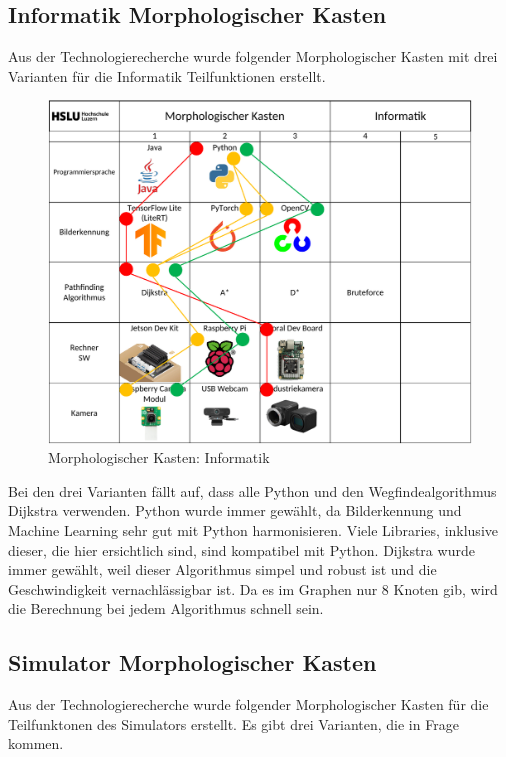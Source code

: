 \subsection{Informatik Morphologischer Kasten}

Aus der Technologierecherche wurde folgender Morphologischer Kasten mit drei Varianten für die Informatik Teilfunktionen erstellt.

\begin{figure}[H]
\centering
\includegraphics[width=\textwidth]{assets/MK_Informatik.pdf}
\caption{Morphologischer Kasten: Informatik}
\label{fig:mk-informatik}
\end{figure}


Bei den drei Varianten fällt auf, dass alle Python und den Wegfindealgorithmus Dijkstra verwenden. Python wurde immer gewählt, da Bilderkennung und Machine Learning sehr gut mit Python harmonisieren. Viele Libraries, inklusive dieser, die hier ersichtlich sind, sind kompatibel mit Python. Dijkstra wurde immer gewählt, weil dieser Algorithmus simpel und robust ist und die Geschwindigkeit vernachlässigbar ist. Da es im Graphen nur 8 Knoten gib, wird die Berechnung bei jedem Algorithmus schnell sein.

\subsection{Simulator Morphologischer Kasten}


Aus der Technologierecherche wurde folgender Morphologischer Kasten für die Teilfunktonen des Simulators erstellt. Es gibt drei Varianten, die in Frage kommen.

